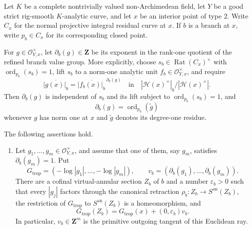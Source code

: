 
\begin{proposition}
\label{prop:p21p3-gf-virtual-annulus-bridge}
Let \(K\) be a complete nontrivially valued non-Archimedean field, let
\(Y\) be a good strict rig-smooth \(K\)-analytic curve, and let \(x\) be an
interior point of type \(2\).  Write \(C_x\) for the normal projective
integral residual curve at \(x\).  If \(b\) is a branch at \(x\), write
\(p_b\in C_x\) for its corresponding closed point.

For \(g\in\mathcal O_{Y,x}^{\times}\), let
\(\partial_b(g)\in\mathbf Z\) be its exponent in the rank-one quotient of
the refined branch value group.  More explicitly, choose
\(s_b\in\operatorname{Rat}(C_x)^{\times}\) with
\(\operatorname{ord}_{p_b}(s_b)=1\), lift \(s_b\) to a norm-one analytic
unit \(f_b\in\mathcal O_{Y,x}^{\times}\), and require
\begin{equation}
\label{eq:p21p3-gf-branch-order-definition}
 \overline{|g(x)|_b}
 =\overline{|f_b(x)|_b}^{\,\partial_b(g)}
 \quad\text{in}\quad
 |\mathcal H(x)^{\times}|_b/|\mathcal H(x)^{\times}|.
\end{equation}
Then \(\partial_b(g)\) is independent of \(s_b\) and its lift subject to
\(\operatorname{ord}_{p_b}(s_b)=1\), and
\begin{equation}
\label{eq:p21p3-gf-branch-order-residue}
 \partial_b(g)=\operatorname{ord}_{p_b}(\widetilde g)
\end{equation}
whenever \(g\) has norm one at \(x\) and \(\widetilde g\) denotes its
degree-one residue.

The following assertions hold.
\begin{enumerate}
\item\label{itm:p21p3-gf-bridge:ray}
Let \(g_1,\ldots,g_m\in\mathcal O_{Y,x}^{\times}\), and assume that one
of them, say \(g_m\), satisfies \(\partial_b(g_m)=1\).  Put
\[
 G_{\mathrm{trop}}
   =(-\log|g_1|,\ldots,-\log|g_m|),
 \qquad
 v_b=(\partial_b(g_1),\ldots,\partial_b(g_m)).
\]
There are a cofinal virtual-annular section \(Z_b\) of \(b\) and a number
\(\varepsilon_b>0\) such that every \(|g_j|\) factors through the canonical
retraction \(\rho_b:Z_b\to S^{\mathrm{an}}(Z_b)\), the restriction of
\(G_{\mathrm{trop}}\) to \(S^{\mathrm{an}}(Z_b)\) is a homeomorphism, and
\begin{equation}
\label{eq:p21p3-gf-exact-branch-ray}
 G_{\mathrm{trop}}(Z_b)
 =G_{\mathrm{trop}}(x)+(0,\varepsilon_b)v_b.
\end{equation}
In particular, \(v_b\in\mathbf Z^m\) is the primitive outgoing tangent of
this Euclidean ray.


\end{enumerate}
\end{proposition}
